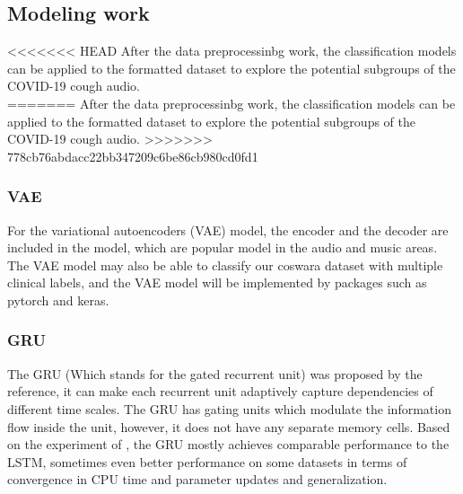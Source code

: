 \documentclass[11pt]{article}
\begin{document}
\subsection{Modeling work}
<<<<<<< HEAD
After the data preprocessinbg work, the classification models can be applied to the formatted
dataset to explore the potential subgroups of the COVID-19 cough audio. \\
=======
After the data preprocessinbg work, the classification models can be applied to the formatted 
dataset to explore the potential subgroups of the COVID-19 cough audio. 
>>>>>>> 778cb76abdacc22bb347209c6be86cb980cd0fd1

\subsubsection{VAE}
For the variational autoencoders (VAE) model,
the encoder and the decoder are included in the model, which are popular model in the audio and
music areas\cite{girin2020dynamical}. The VAE model may also be able to classify our coswara dataset with multiple
clinical labels, and the VAE model will be implemented by packages such as pytorch and keras.

\subsubsection{GRU}
The GRU (Which stands for the gated recurrent unit) was proposed by the reference\cite{cho-etal-2014-properties}, it can make each recurrent
 unit adaptively capture dependencies of different time scales. The GRU has gating units which
 modulate the information flow inside the unit, however, it does not have any separate memory cells.
 Based on the experiment of \cite{Wang2nd}, the GRU mostly achieves comparable performance to the LSTM, sometimes
 even better performance on some datasets in terms of convergence in CPU time and parameter updates and
 generalization.
\end{document}
